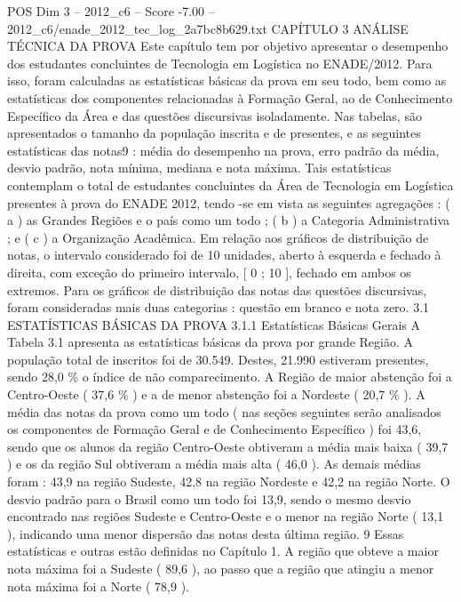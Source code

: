 \begin{textsample}{POS Dim 3 – 2012\_c6 – Score -7.00 – 2012\_c6/enade\_2012\_tec\_log\_2a7bc8b629.txt}  \label{ex:f3_pos_263}
CAPÍTULO 3 ANÁLISE TÉCNICA DA PROVA Este capítulo tem por objetivo apresentar o desempenho dos estudantes concluintes de Tecnologia em Logística no ENADE/2012.
Para isso, foram calculadas as estatísticas básicas da prova em seu todo, bem como as estatísticas dos componentes relacionadas à Formação Geral, ao de Conhecimento Específico da Área e das questões discursivas isoladamente.
Nas tabelas, são apresentados o tamanho da população inscrita e de presentes, e as seguintes estatísticas das notas9 : média do desempenho na prova, erro padrão da média, desvio padrão, nota mínima, mediana e nota máxima.
Tais estatísticas contemplam o total de estudantes concluintes da Área de Tecnologia em Logística presentes à prova do ENADE 2012, tendo -se em vista as seguintes agregações : ( a ) as Grandes Regiões e o país como um todo ; ( b ) a Categoria Administrativa ; e ( c ) a Organização Acadêmica.
Em relação aos gráficos de distribuição de notas, o intervalo considerado foi de 10 unidades, aberto à esquerda e fechado à direita, com exceção do primeiro intervalo, [ 0 ; 10 ], fechado em ambos os extremos.
Para os gráficos de distribuição das notas das questões discursivas, foram consideradas mais duas categorias : questão em branco e nota zero. 3.1 ESTATÍSTICAS BÁSICAS DA PROVA 3.1.1 Estatísticas Básicas Gerais A Tabela 3.1 apresenta as estatísticas básicas da prova por grande Região.
A população total de inscritos foi de 30.549.
Destes, 21.990 estiveram presentes, sendo 28,0 \% o índice de não comparecimento.
A Região de maior abstenção foi a Centro-Oeste ( 37,6 \% ) e a de menor abstenção foi a Nordeste ( 20,7 \% ).
A média das notas da prova como um todo ( nas seções seguintes serão analisados os componentes de Formação Geral e de Conhecimento Específico ) foi 43,6, sendo que os alunos da região Centro-Oeste obtiveram a média mais baixa ( 39,7 ) e os da região Sul obtiveram a média mais alta ( 46,0 ).
As demais médias foram : 43,9 na região Sudeste, 42,8 na região Nordeste e 42,2 na região Norte.
O desvio padrão para o Brasil como um todo foi 13,9, sendo o mesmo desvio encontrado nas regiões Sudeste e Centro-Oeste e o menor na região Norte ( 13,1 ), indicando uma menor dispersão das notas desta última região. 9 Essas estatísticas e outras estão definidas no Capítulo 1.
A região que obteve a maior nota máxima foi a Sudeste ( 89,6 ), ao passo que a região que atingiu a menor nota máxima foi a Norte ( 78,9 ).

\end{textsample}

